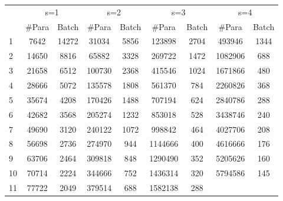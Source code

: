 \begin{table}[]
\begin{tabular}{c|c|c|c|c|c|c|c|c|}
\cline{2-9}
                         & \multicolumn{2}{c|}{s=1}  & \multicolumn{2}{c|}{s=2}  & \multicolumn{2}{c|}{s=3}  & \multicolumn{2}{c|}{s=4}  \\ \cline{1-1}
\multicolumn{1}{|l|}{}   & \#Para & Batch & \#Para & Batch & \#Para & Batch & \#Para & Batch \\ \hline
\multicolumn{1}{|l|}{1}  & 7642         & 14272      & 31034        & 5856       & 123898       & 2704       & 493946       & 1344       \\ \hline
\multicolumn{1}{|l|}{2}  & 14650        & 8816       & 65882        & 3328       & 269722       & 1472       & 1082906      & 688        \\ \hline
\multicolumn{1}{|l|}{3}  & 21658        & 6512       & 100730       & 2368       & 415546       & 1024       & 1671866      & 480        \\ \hline
\multicolumn{1}{|l|}{4}  & 28666        & 5072       & 135578       & 1808       & 561370       & 784        & 2260826      & 368        \\ \hline
\multicolumn{1}{|l|}{5}  & 35674        & 4208       & 170426       & 1488       & 707194       & 624        & 2840786      & 288        \\ \hline
\multicolumn{1}{|l|}{6}  & 42682        & 3568       & 205274       & 1232       & 853018       & 528        & 3438746      & 240        \\ \hline
\multicolumn{1}{|l|}{7}  & 49690        & 3120       & 240122       & 1072       & 998842       & 464        & 4027706      & 208        \\ \hline
\multicolumn{1}{|l|}{8}  & 56698        & 2736       & 274970       & 944        & 1144666      & 400        & 4616666      & 176        \\ \hline
\multicolumn{1}{|l|}{9}  & 63706        & 2464       & 309818       & 848        & 1290490      & 352        & 5205626      & 160        \\ \hline
\multicolumn{1}{|l|}{10} & 70714        & 2224       & 344666       & 752        & 1436314      & 320        & 5794586      & 145        \\ \hline
\multicolumn{1}{|l|}{11} & 77722        & 2049       & 379514       & 688        & 1582138      & 288        &              &            \\ \hline
\end{tabular}
\end{table}


